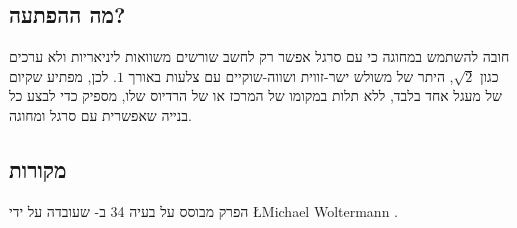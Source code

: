 
\subsection*{מה ההפתעה?}

חובה להשתמש במחוגה כי עם סרגל אפשר רק לחשב שורשים  משוואות ליניאריות ולא ערכים כגון
$\sqrt{2}$,
היתר של משולש ישר-זווית ושווה-שוקיים עם צלעות באורך
$1$.
לכן, מפתיע שקיום של מעגל אחד בלבד, ללא תלות במקומו של המרכז או של הרדיוס שלו, מספיק כדי לבצע כל בנייה שאפשרית עם סרגל ומחוגה.


\subsection*{מקורות}
הפרק מבוסס על בעיה 34
ב-%
\cite{dorrie1}
שעובדה על ידי
\L{Michael Woltermann} \cite{dorrie2}. 
